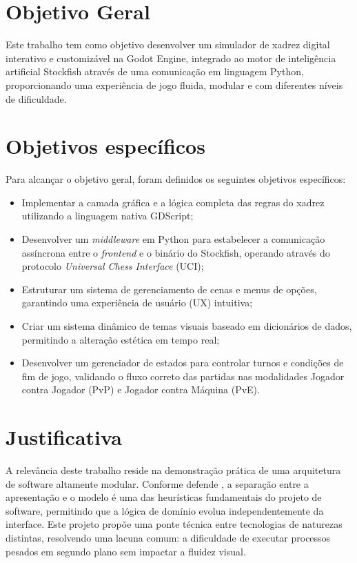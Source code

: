 \section{Objetivo Geral}

Este trabalho tem como objetivo desenvolver um simulador de xadrez digital interativo e customizável na Godot Engine, integrado ao motor de inteligência artificial Stockfish através de uma comunicação em linguagem Python, proporcionando uma experiência de jogo fluida, modular e com diferentes níveis de dificuldade.

\section{Objetivos específicos}

Para alcançar o objetivo geral, foram definidos os seguintes objetivos específicos: 

\begin{itemize}
	\item Implementar a camada gráfica e a lógica completa das regras do xadrez utilizando a linguagem nativa GDScript;
	\item Desenvolver um \textit{middleware} em Python para estabelecer a comunicação assíncrona entre o \textit{frontend} e o binário do Stockfish, operando através do protocolo \textit{Universal Chess Interface} (UCI);
	\item Estruturar um sistema de gerenciamento de cenas e menus de opções, garantindo uma experiência de usuário (UX) intuitiva;
	\item Criar um sistema dinâmico de temas visuais baseado em dicionários de dados, permitindo a alteração estética em tempo real;
	\item Desenvolver um gerenciador de estados para controlar turnos e condições de fim de jogo, validando o fluxo correto das partidas nas modalidades Jogador contra Jogador (PvP) e Jogador contra Máquina (PvE).
\end{itemize}

\section{Justificativa}
\label{secao:justificativa}

A relevância deste trabalho reside na demonstração prática de uma arquitetura de software altamente modular. Conforme defende , a separação entre a apresentação e o modelo é uma das heurísticas fundamentais do projeto de software, permitindo que a lógica de domínio evolua independentemente da interface. Este projeto propõe uma ponte técnica entre tecnologias de naturezas distintas, resolvendo uma lacuna comum: a dificuldade de executar processos pesados em segundo plano sem impactar a fluidez visual. 


